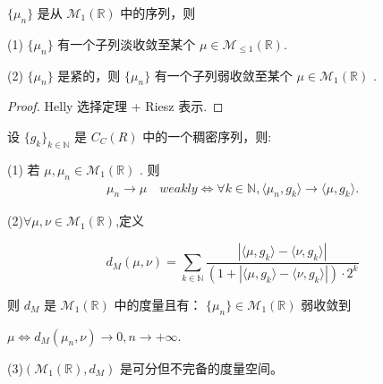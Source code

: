 \begin{lemma} $\{\mu_n\}$ 是从 $\mathcal{M}_1({\mathbb{R}})$ 中的序列，则

(1) $\{\mu_n\}$ 有一个子列淡收敛至某个 $\mu \in \mathcal{M}_{\leq 1}(\mathbb{R})$.

(2) $\{\mu_n\}$ 是紧的，则 $\{\mu_n\}$ 有一个子列弱收敛至某个 $\mu \in \mathcal{M}_1(\mathbb{R})$ .

\end{lemma}

\begin{proof}
    Helly 选择定理 + Riesz 表示.
\end{proof}

\begin{theorem}
    设 $\{g_k\}_{k \in \mathbb{N}}$ 是 $C_C(R)$ 中的一个稠密序列，则:

(1) 若 $\mu, \mu_n \in \mathcal{M}_1(\mathbb{R})$ . 则 
\begin{equation*}
    \begin{aligned}
        \mu_n \rightarrow \mu \quad weakly \Leftrightarrow
        \forall k\in\mathbb{N}, \langle \mu_n,g_k\rangle \to \langle\mu,g_k\rangle.
    \end{aligned}
\end{equation*}

(2)$\forall \mu,\nu \in \mathcal{M}_1(\mathbb{R})$,定义

\[ d_M(\mu,\nu) = \sum_{k\in\mathbb{N}} \frac{|\langle \mu,g_k\rangle-\langle\nu,g_k\rangle|}{(1+|\langle \mu,g_k\rangle-\langle\nu,g_k\rangle|) \cdot 2^k} \]

则 $ d_M $ 是 $ \mathcal{M}_1(\mathbb{R}) $ 中的度量且有： $\{\mu_n\} \in \mathcal{M}_1(\mathbb{R})$ 弱收敛到

$\mu \iff d_M(\mu_n,\nu) \to 0, n \to +\infty$.

(3)$(\mathcal{M}_1(\mathbb{R}), d_M)$ 是可分但不完备的度量空间。


\end{theorem}

